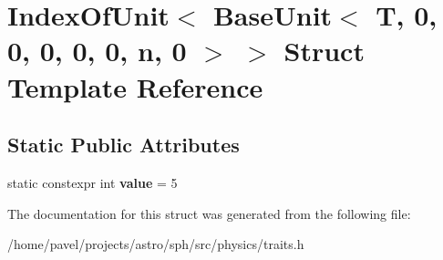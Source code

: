 \hypertarget{structIndexOfUnit_3_01BaseUnit_3_01T_00_010_00_010_00_010_00_010_00_010_00_01n_00_010_01_4_01_4}{}\section{Index\+Of\+Unit$<$ Base\+Unit$<$ T, 0, 0, 0, 0, 0, n, 0 $>$ $>$ Struct Template Reference}
\label{structIndexOfUnit_3_01BaseUnit_3_01T_00_010_00_010_00_010_00_010_00_010_00_01n_00_010_01_4_01_4}
\subsection*{Static Public Attributes}
\begin{DoxyCompactItemize}
\item 
\hypertarget{structIndexOfUnit_3_01BaseUnit_3_01T_00_010_00_010_00_010_00_010_00_010_00_01n_00_010_01_4_01_4_a668ff889732cfb6c7e183ec477bd78c7}{}\label{structIndexOfUnit_3_01BaseUnit_3_01T_00_010_00_010_00_010_00_010_00_010_00_01n_00_010_01_4_01_4_a668ff889732cfb6c7e183ec477bd78c7} 
static constexpr int {\bfseries value} = 5
\end{DoxyCompactItemize}


The documentation for this struct was generated from the following file\+:\begin{DoxyCompactItemize}
\item 
/home/pavel/projects/astro/sph/src/physics/traits.\+h\end{DoxyCompactItemize}
